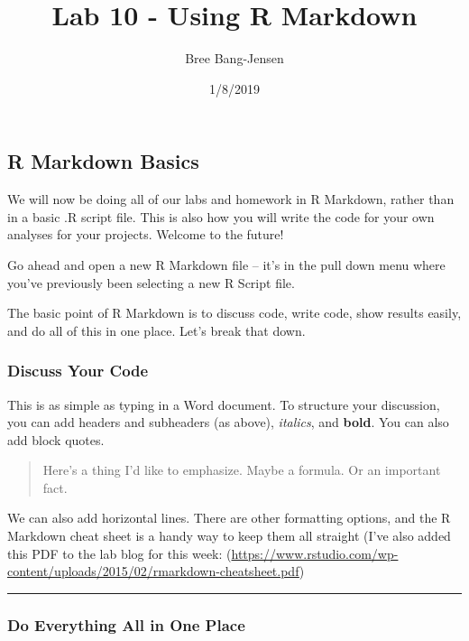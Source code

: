 \documentclass[]{article}
\title{Lab 10 - Using R Markdown}
\author{Bree Bang-Jensen}
\date{1/8/2019}
\begin{document}
\maketitle

\hypertarget{r-markdown-basics}{%
\subsection{R Markdown Basics}\label{r-markdown-basics}}

We will now be doing all of our labs and homework in R Markdown, rather
than in a basic .R script file. This is also how you will write the code
for your own analyses for your projects. Welcome to the future!

Go ahead and open a new R Markdown file -- it's in the pull down menu
where you've previously been selecting a new R Script file.

The basic point of R Markdown is to discuss code, write code, show
results easily, and do all of this in one place. Let's break that down.

\hypertarget{discuss-your-code}{%
\subsubsection{Discuss Your Code}\label{discuss-your-code}}

This is as simple as typing in a Word document. To structure your
discussion, you can add headers and subheaders (as above),
\emph{italics}, and \textbf{bold}. You can also add block quotes.

\begin{quote}
Here's a thing I'd like to emphasize. Maybe a formula. Or an important
fact.
\end{quote}

We can also add horizontal lines. There are other formatting options,
and the R Markdown cheat sheet is a handy way to keep them all straight
(I've also added this PDF to the lab blog for this week:
(\url{https://www.rstudio.com/wp-content/uploads/2015/02/rmarkdown-cheatsheet.pdf})

\begin{center}\rule{0.5\linewidth}{\linethickness}\end{center}

\hypertarget{do-everything-all-in-one-place}{%
\subsubsection{Do Everything All in One
Place}\label{do-everything-all-in-one-place}}
\end{document}
